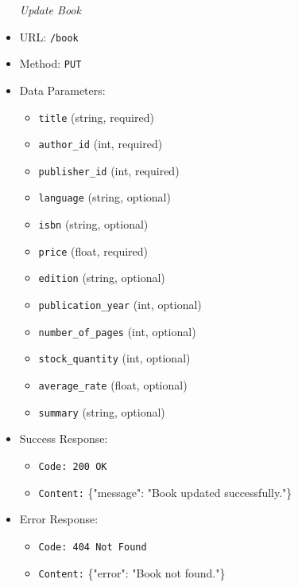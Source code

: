 \begin{itemize}
\item[\textit{Update Book}] 
\item URL: \texttt{/book}  
\item Method: \texttt{PUT}  
\item Data Parameters: 
\begin{itemize}
  \item \texttt{title} (string, required)  
  \item \texttt{author\_id} (int, required)  
  \item \texttt{publisher\_id} (int, required)  
  \item \texttt{language} (string, optional)  
  \item \texttt{isbn} (string, optional)  
  \item \texttt{price} (float, required)  
  \item \texttt{edition} (string, optional)  
  \item \texttt{publication\_year} (int, optional)  
  \item \texttt{number\_of\_pages} (int, optional)  
  \item \texttt{stock\_quantity} (int, optional)  
  \item \texttt{average\_rate} (float, optional)  
  \item \texttt{summary} (string, optional)  
\end{itemize} 
\item Success Response:
\begin{itemize}
  \item \texttt{Code: 200 OK}  
  \item \texttt{Content:} \{"message": "Book updated successfully."\}
\end{itemize}
\item Error Response:
\begin{itemize}
  \item \texttt{Code: 404 Not Found}  
  \item \texttt{Content:} \{"error": "Book not found."\}
\end{itemize}


\end{itemize}
